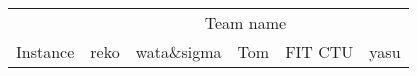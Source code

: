 \documentclass[thesis=M,english,hidelinks]{FITthesis}[2012/10/20]
\theoremstyle{definition}
\begin{document}
\begin{table}[ht]
    \tiny
    \centering
    \begin{tabular}{ m{1cm} | m{1.5cm} m{1.5cm} m{1.5cm} m{1.5cm} m{1.5cm} }
        \toprule
        & \multicolumn{5}{c}{Team name} \\
        Instance & reko & wata\&sigma & Tom & FIT CTU & yasu \\
        \midrule

\end{tabular}
\end{table}
\end{document}
